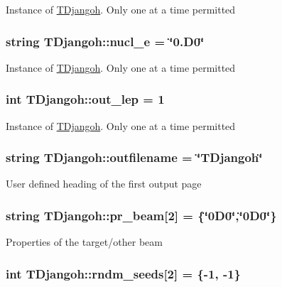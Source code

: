 Instance of \hyperlink{class_t_djangoh}{T\+Djangoh}. Only one at a time permitted \hypertarget{class_t_djangoh_a80f9f3c2ff9458df6c37f9a730d0d9d7}{
\subsubsection[{nucl\+\_\+e}]{\setlength{\rightskip}{0pt plus 5cm}string T\+Djangoh\+::nucl\+\_\+e = \char`\"{}0.\+D0\char`\"{}}}\label{class_t_djangoh_a80f9f3c2ff9458df6c37f9a730d0d9d7}
Instance of \hyperlink{class_t_djangoh}{T\+Djangoh}. Only one at a time permitted \hypertarget{class_t_djangoh_a4b87824fa6a4af88c4c9bb69fdd87f31}{
\subsubsection[{out\+\_\+lep}]{\setlength{\rightskip}{0pt plus 5cm}int T\+Djangoh\+::out\+\_\+lep = 1}}\label{class_t_djangoh_a4b87824fa6a4af88c4c9bb69fdd87f31}
Instance of \hyperlink{class_t_djangoh}{T\+Djangoh}. Only one at a time permitted \hypertarget{class_t_djangoh_ad1228120d77c6b6ddaced2c91715415c}{
\subsubsection[{outfilename}]{\setlength{\rightskip}{0pt plus 5cm}string T\+Djangoh\+::outfilename = \char`\"{}T\+Djangoh\char`\"{}}}\label{class_t_djangoh_ad1228120d77c6b6ddaced2c91715415c}
User defined heading of the first output page \hypertarget{class_t_djangoh_ab3ffe8251846f31857f84d4368a31d96}{
\subsubsection[{pr\+\_\+beam}]{\setlength{\rightskip}{0pt plus 5cm}string T\+Djangoh\+::pr\+\_\+beam\mbox{[}2\mbox{]} = \{\char`\"{}0\+D0\char`\"{},\char`\"{}0\+D0\char`\"{}\}}}\label{class_t_djangoh_ab3ffe8251846f31857f84d4368a31d96}
Properties of the target/other beam \hypertarget{class_t_djangoh_aa3e99a785adc52679432d6446dfdc850}{
\subsubsection[{rndm\+\_\+seeds}]{\setlength{\rightskip}{0pt plus 5cm}int T\+Djangoh\+::rndm\+\_\+seeds\mbox{[}2\mbox{]} = \{-\/1, -\/1\}}}\label{class_t_djangoh_aa3e99a785adc52679432d6446dfdc850}
